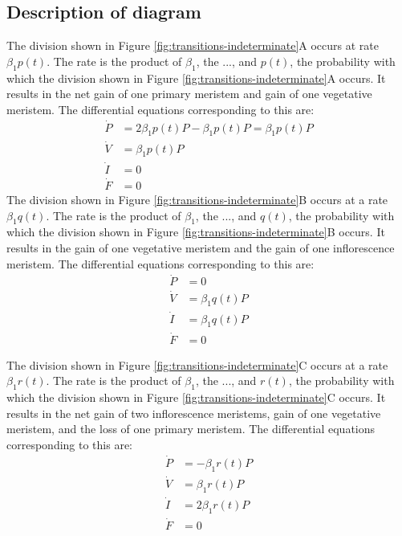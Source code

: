 \documentclass[12pt, oneside,titlepage]{article}   	%
\begin{document}
\subsection{Description of diagram}

The division shown in Figure \ref{fig:transitions-indeterminate}A occurs at rate $\beta_1 p(t)$. The rate is the product of $\beta_1$, the ..., and $p(t)$, the probability with which the division shown in Figure \ref{fig:transitions-indeterminate}A occurs. It results in the net gain of one primary meristem and gain of one vegetative meristem. The differential equations corresponding to this are:
%
\begin{align}
\dot{P} & = 2 \beta_1 p(t)  P - \beta_1 p(t) P = \beta_1 p(t) P \nonumber \\
\dot{V} & = \beta_1 p(t)  P      \nonumber \\
\dot{I} & = 0  \nonumber \\
\dot{F} & = 0
\end{align}
%
The division shown in Figure \ref{fig:transitions-indeterminate}B occurs at a rate $\beta_1 q(t)$. The rate is the product of $\beta_1$, the ..., and $q(t)$, the probability with which the division shown in Figure \ref{fig:transitions-indeterminate}B occurs. It results in the gain of one vegetative meristem and the gain of one inflorescence meristem. The differential equations corresponding to this are:
%
\begin{align}
\dot{P} & = 0 \nonumber \\
\dot{V} & = \beta_1 q(t) P      \nonumber \\
\dot{I} & =  \beta_1 q(t) P \nonumber \\
\dot{F} & = 0
\end{align}
%

The division shown in Figure \ref{fig:transitions-indeterminate}C occurs at a rate $\beta_1 r(t)$. The rate is the product of $\beta_1$, the ..., and $r(t)$, the probability with which the division shown in Figure \ref{fig:transitions-indeterminate}C occurs. It results in the net gain of two inflorescence meristems, gain of one vegetative meristem, and the loss of one primary meristem. The differential equations corresponding to this are:
%
\begin{align}
\dot{P} & = - \beta_1 r(t) P \nonumber \\
\dot{V} & = \beta_1 r(t)  P      \nonumber \\
\dot{I} & =  2 \beta_1 r(t) P \nonumber \\
\dot{F} & = 0
\end{align}
%
\end{document}
